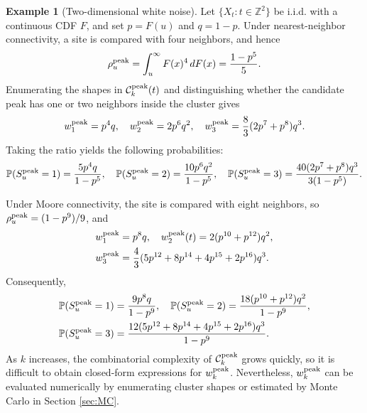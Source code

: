 \documentclass[aap,preprint]{imsart}
\theoremstyle{plain}
\theoremstyle{definition}
\newtheorem{example}[theorem]{Example}
\def\P{{\mathbb P}}
\def\Z{{\mathbb Z}}
\begin{document}
	
	
	\begin{example}[Two-dimensional white noise]
		\label{example:WNF-peak}
		Let $\{X_t:t\in\Z^2\}$ be i.i.d. with a continuous CDF $F$, and set
		$p=F(u)$ and $q=1-p$.  Under nearest-neighbor connectivity, a site is
		compared with four neighbors, and hence
		\[
		\rho_u^{\rm peak}
		=\int_u^\infty F(x)^4\,dF(x)
		=\frac{1-p^5}{5}.
		\]
		Enumerating the shapes in $\mathcal C_k^{\rm peak}(t)$ and distinguishing
		whether the candidate peak has one or two neighbors inside the cluster
		gives
		\begin{equation*}
			\begin{split}
				w_1^{\rm peak} = p^4q, \quad w_2^{\rm peak} = 2p^6q^2, \quad w_3^{\rm peak} = \frac{8}{3}(2p^7+p^8)q^3.
			\end{split}
		\end{equation*}
		Taking the ratio yields the following probabilities:
		\begin{equation*}
			\begin{split}
				\P(S_u^{\rm peak}=1) = \frac{5p^4q}{1-p^5}, \quad \P(S_u^{\rm peak}=2) = \frac{10p^6q^2}{1-p^5}, \quad 
				\P(S_u^{\rm peak}=3) = \frac{40(2p^7+p^8)q^3}{3(1-p^5)}.
			\end{split}
		\end{equation*}
		
		Under Moore connectivity, the site is compared with eight neighbors, so
		$\rho_u^{\rm peak}=(1-p^9)/9$, and
		\begin{equation*}
			\begin{split}
				w_1^{\rm peak} &= p^8q, \quad w_2^{\rm peak}(t) = 2(p^{10}+p^{12})q^2,\\
				w_3^{\rm peak} &= \frac{4}{3}(5p^{12}+8p^{14}+4p^{15}+2p^{16})q^3.
			\end{split}
		\end{equation*}
		Consequently,
		\begin{equation*}
			\begin{split}
				\P(S_u^{\rm peak}=1) &= \frac{9p^8q}{1-p^9}, \quad \P(S_u^{\rm peak}=2) = \frac{18(p^{10}+p^{12})q^2}{1-p^9}, \\
				\P(S_u^{\rm peak}=3) &= \frac{12(5p^{12}+8p^{14}+4p^{15}+2p^{16})q^3}{1-p^9}.
			\end{split}
		\end{equation*}
		As $k$ increases, the combinatorial complexity of $\mathcal{C}_k^{\rm peak}$ grows quickly, so it is difficult to obtain closed-form expressions for $w_k^{\rm peak}$. Nevertheless, $w_k^{\rm peak}$ can be evaluated numerically by enumerating cluster shapes or estimated by Monte Carlo in Section \ref{sec:MC}.
	\end{example}
	
\end{document}
